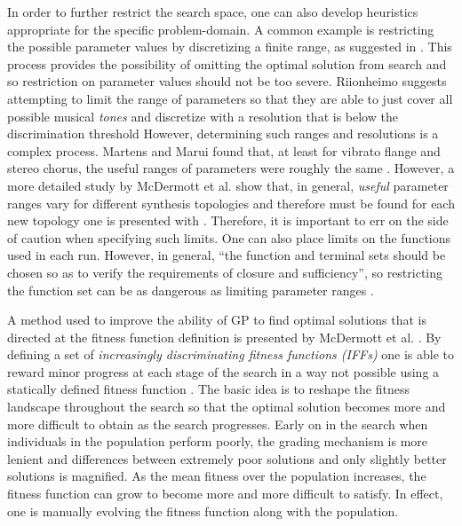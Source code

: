 \documentclass[a4paper,12pt]{report} 	%
\numberwithin{figure}{chapter}
\numberwithin{table}{chapter}
\numberwithin{equation}{chapter}
\begin{document}
\begin{flushleft}
In order to further restrict the search space, one can also develop heuristics appropriate for the specific problem-domain. A common example is restricting the possible parameter values by discretizing a finite range, as suggested in \cite[p. 6]{Riionheimo:2003qo}. This process provides the possibility of omitting the optimal solution from search and so restriction on parameter values should not be too severe. Riionheimo suggests attempting to limit the range of parameters so that they are able to just cover all possible musical \emph{tones} and discretize with a resolution that is below the discrimination threshold \cite[p. 6]{Riionheimo:2003qo} However, determining such ranges and resolutions is a complex process. Martens and Marui found that, at least for vibrato flange and stereo chorus, the useful ranges of parameters were roughly the same \cite[p. 4]{Martens:2009lo}. However, a more detailed study by McDermott et al. show that, in general, \emph{useful} parameter ranges vary for different synthesis topologies and therefore must be found for each new topology one is presented with \cite[p. 5]{McDermott:2005xq}. Therefore, it is important to err on the side of caution when specifying such limits. One can also place limits on the functions used in each run. However, in general, ``the function and terminal sets should be chosen so as to verify the requirements of closure and sufficiency'', so restricting the function set can be as dangerous as limiting parameter ranges \cite[p. 22]{Vanneschi:2004le}. 

A method used to improve the ability of GP to find optimal solutions that is directed at the fitness function definition is presented by McDermott et al. \cite{2006ud}. By defining a set of \emph{increasingly discriminating fitness functions (IFFs)} one is able to reward minor progress at each stage of the search in a way not possible using a statically defined fitness function \cite[p. 15]{2006ud}. The basic idea is to reshape the fitness landscape throughout the search so that the optimal solution becomes more and more difficult to obtain as the search progresses. Early on in the search when individuals in the population perform poorly, the grading mechanism is more lenient and differences between extremely poor solutions and only slightly better solutions is magnified. As the mean fitness over the population increases, the fitness function can grow to become more and more difficult to satisfy. In effect, one is manually evolving the fitness function along with the population.


\end{flushleft}
\end{document}
